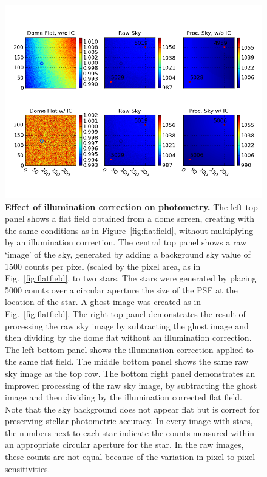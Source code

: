 \documentclass[12pt,preprint]{aastex}
\begin{document}
\begin{figure}[htbp]
\includegraphics[width=6in]{ICeffect}
\caption{ {\small
{\bf Effect of illumination correction on photometry.}
The left top panel shows a flat field obtained from a dome screen,
creating with the same conditions as in Figure~\ref{fig:flatfield},
without multiplying by an illumination correction. The central top
panel shows a raw `image' of the sky, generated by adding a background
sky value of 1500 counts per pixel (scaled by the pixel area, as in
Fig.~\ref{fig:flatfield}, to two stars. The stars were generated by
placing 5000 counts over a circular aperture the size of the PSF at
the location of the star. A ghost image was created as in
Fig.~\ref{fig:flatfield}.  The right top panel demonstrates the result
of processing the raw sky image by subtracting the ghost image and
then dividing by the dome flat without an
illumination correction. 
The left bottom panel shows the illumination correction applied to the
same flat field. The middle bottom panel shows the same raw sky image as
the top row. The bottom right panel demonstrates an improved processing
of the raw sky image, by subtracting the ghost image and then dividing
by the illumination corrected flat field. 
Note that the sky background does not appear
flat but is correct for preserving stellar photometric accuracy. 
In every image with stars, the numbers next to each star indicate the
counts measured within an appropriate circular aperture for the
star. In the raw images, these counts are not equal because of the
variation in pixel to pixel sensitivities. \label{fig:iceffect} 
 }}
\end{figure}
\end{document}
